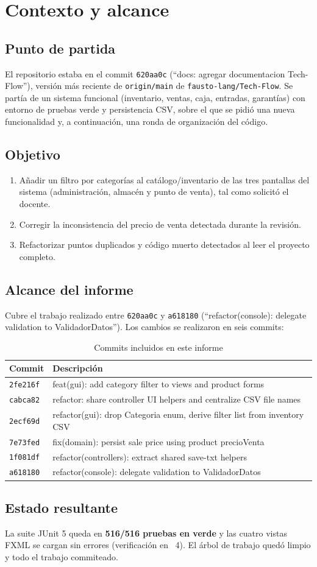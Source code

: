 \chapter{Contexto y alcance}

\section{Punto de partida}
El repositorio estaba en el commit \texttt{620aa0c} (``docs: agregar documentacion Tech-Flow''), versión más reciente de \texttt{origin/main} de \texttt{fausto-lang/Tech-Flow}. Se partía de un sistema funcional (inventario, ventas, caja, entradas, garantías) con entorno de pruebas verde y persistencia CSV, sobre el que se pidió una nueva funcionalidad y, a continuación, una ronda de organización del código.

\section{Objetivo}
\begin{enumerate}
\item Añadir un filtro por categorías al catálogo/inventario de las tres pantallas del sistema (administración, almacén y punto de venta), tal como solicitó el docente.
\item Corregir la inconsistencia del precio de venta detectada durante la revisión.
\item Refactorizar puntos duplicados y código muerto detectados al leer el proyecto completo.
\end{enumerate}

\section{Alcance del informe}
Cubre el trabajo realizado entre \texttt{620aa0c} y \texttt{a618180} (``refactor(console): delegate validation to ValidadorDatos''). Los cambios se realizaron en seis commits:

\begin{table}[H]\centering\caption{Commits incluidos en este informe}
\begin{tabular}{lp{}}\toprule
Commit & Descripción\\\midrule
\texttt{2fe216f} & feat(gui): add category filter to views and product forms\\
\texttt{cabca82} & refactor: share controller UI helpers and centralize CSV file names\\
\texttt{2ecf69d} & refactor(gui): drop Categoria enum, derive filter list from inventory CSV\\
\texttt{7e73fed} & fix(domain): persist sale price using product precioVenta\\
\texttt{1f081df} & refactor(controllers): extract shared save-txt helpers\\
\texttt{a618180} & refactor(console): delegate validation to ValidadorDatos\\\bottomrule
\end{tabular}\end{table}

\section{Estado resultante}
La suite JUnit 5 queda en \textbf{516/516 pruebas en verde} y las cuatro vistas FXML se cargan sin errores (verificación en \chaptername\ 4). El árbol de trabajo quedó limpio y todo el trabajo commiteado.
